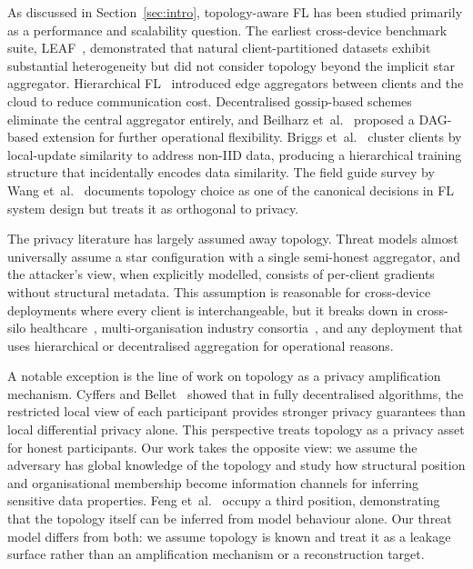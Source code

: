\documentclass[letterpaper,journal]{IEEEtran}
\begin{document}
As discussed in Section~\ref{sec:intro}, topology-aware FL has been
studied primarily as a performance and scalability question. The
earliest cross-device benchmark suite, LEAF~\cite{leaf2018},
demonstrated that natural client-partitioned datasets exhibit
substantial heterogeneity but did not consider topology beyond the
implicit star aggregator. Hierarchical FL~\cite{liu2020hierarchical,abad2020icassp}
introduced edge aggregators between clients and the cloud to reduce
communication cost. Decentralised gossip-based
schemes~\cite{roy2019braintorrent,hegedus2021decentralized} eliminate
the central aggregator entirely, and Beilharz
et~al.~\cite{beilharz2021dag} proposed a DAG-based extension for
further operational flexibility. Briggs
et~al.~\cite{briggs2020hierarchical} cluster clients by local-update
similarity to address non-IID data, producing a hierarchical training
structure that incidentally encodes data similarity. The field guide
survey by Wang et~al.~\cite{wang2021fieldguide} documents topology
choice as one of the canonical decisions in FL system design but
treats it as orthogonal to privacy.

The privacy literature has largely assumed away topology. Threat
models almost universally assume a star configuration with a single
semi-honest aggregator, and the attacker's view, when explicitly
modelled, consists of per-client gradients without structural
metadata. This assumption is reasonable for cross-device deployments
where every client is interchangeable, but it breaks down in
cross-silo healthcare~\cite{flamby2022,sheller2020medicine,dayan2021covid},
multi-organisation industry consortia~\cite{melloddy2024}, and any
deployment that uses hierarchical or decentralised aggregation for
operational reasons.

A notable exception is the line of work on topology as a privacy
amplification mechanism. Cyffers and
Bellet~\cite{cyffers2022amplification} showed that in fully
decentralised algorithms, the restricted local view of each
participant provides stronger privacy guarantees than local
differential privacy alone. This perspective treats topology as a privacy asset for
honest participants. Our work takes the opposite view: we assume the
adversary has global knowledge of the topology and study how
structural position and organisational membership become information
channels for inferring sensitive data properties. Feng
et~al.~\cite{feng2025topology} occupy a third position, demonstrating
that the topology itself can be inferred from model behaviour alone.
Our threat model differs from both: we assume topology is known and
treat it as a leakage surface rather than an amplification mechanism
or a reconstruction target.
\end{document}
